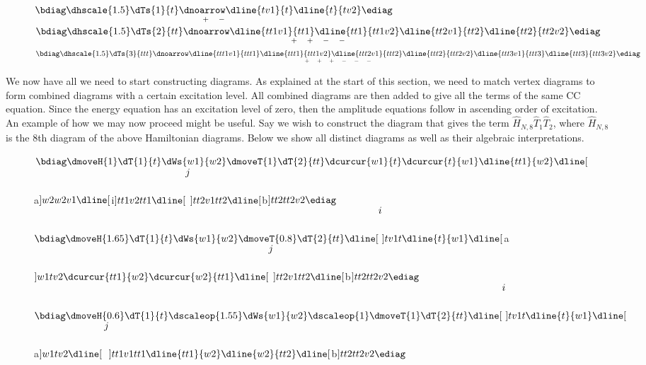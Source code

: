 	\begin{figure}[h]
		\centering
		$
		\underset{+\quad-}{\bdiag
		\dhscale{1.5}
		\dTs{1}{t}
		\dnoarrow
		\dline{tv1}{t}
		\dline{t}{tv2}
		\ediag}
		$
		\hspace{2cm}
		$
		\underset{+\quad+\quad-\quad-}{\bdiag
		\dhscale{1.5}
		\dTs{2}{tt}
		\dnoarrow
		\dline{tt1v1}{tt1}
		\dline{tt1}{tt1v2}
		\dline{tt2v1}{tt2}
		\dline{tt2}{tt2v2}
		\ediag}
		$
		\hspace{2cm}
		$
		\underset{+\quad+\quad+\quad-\quad-\quad-}{\bdiag
		\dhscale{1.5}
		\dTs{3}{ttt}
		\dnoarrow
		\dline{ttt1v1}{ttt1}
		\dline{ttt1}{ttt1v2}
		\dline{ttt2v1}{ttt2}
		\dline{ttt2}{ttt2v2}
		\dline{ttt3v1}{ttt3}
		\dline{ttt3}{ttt3v2}
		\ediag}
		$
	\end{figure}
	
	We now have all we need to start constructing diagrams. As explained at the start of this section, we need to match vertex diagrams to form combined diagrams with a certain excitation level. All combined diagrams are then added to give all the terms of the same CC equation. Since the energy equation has an excitation level of zero, then the amplitude equations follow in ascending order of excitation.\\
	
	An example of how we may now proceed might be useful. Say we wish to construct the diagram that gives the term $\hat{H}_{N,8}\hat{T}_1\hat{T}_2$, where $\hat{H}_{N,8}$ is the 8th diagram of the above Hamiltonian diagrams. Below we show all distinct diagrams as well as their algebraic interpretations.
	
	\begin{figure}[h]
		\centering
		$\bdiag
			\dmoveH{1}
			\dT{1}{t}
			\dWs{w1}{w2}
			\dmoveT{1}
			\dT{2}{tt}
			\dcurcur{w1}{t}
			\dcurcur{t}{w1}
			\dline{tt1}{w2}
			\dline[$\:a$]{w2}{w2v1}
			\dline[$\:i$]{tt1v2}{tt1}
			\dline[\raisebox{1cm}{$j$}]{tt2v1}{tt2}
			\dline[$\:b$]{tt2}{tt2v2}
			\ediag
		$
		\hspace{2cm}
		$
		\bdiag
		\dmoveH{1.65}
		\dT{1}{t}
		\dWs{w1}{w2}
		\dmoveT{0.8}
		\dT{2}{tt}
		\dline[\raisebox{1cm}{$i$}]{tv1}{t}
		\dline{t}{w1}
		\dline[$\:a$]{w1}{tv2}
		\dcurcur{tt1}{w2}
		\dcurcur{w2}{tt1}
		\dline[\raisebox{1cm}{$j$}]{tt2v1}{tt2}
		\dline[$\:b$]{tt2}{tt2v2}
		\ediag
		$
		\hspace{2cm}
		$
		\bdiag
		\dmoveH{0.6}
		\dT{1}{t}
		\dscaleop{1.55}
		\dWs{w1}{w2}
		\dscaleop{1}
		\dmoveT{1}
		\dT{2}{tt}
		\dline[\raisebox{1cm}{$i$}]{tv1}{t}
		\dline{t}{w1}
		\dline[$\:a$]{w1}{tv2}
		\dline[\raisebox{1cm}{$\:j$}]{tt1v1}{tt1}
		\dline{tt1}{w2}
		\dline{w2}{tt2}
		\dline[$\:b$]{tt2}{tt2v2}
		\ediag
		$
	\end{figure}
	
